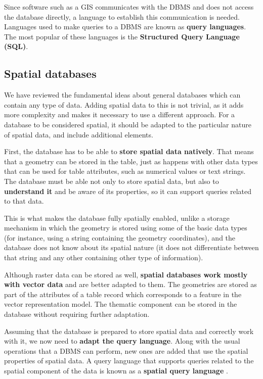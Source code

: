 Since software such as a GIS communicates with the DBMS and does not access the database directly, a language to establish this communication is needed. Languages used to make queries to a DBMS are known as \textbf{query languages}. The most popular of these languages is the \textbf{Structured Query Language (SQL)}.

\subsection{Spatial databases}

We have reviewed the fundamental ideas about general databases which can contain any type of data. Adding spatial data to this is not trivial, as it adds more complexity and makes it necessary to use a different approach. For a database to be considered spatial, it should be adapted to the particular nature of spatial data, and include additional elements.

First, the database has to be able to \textbf{store spatial data natively}. That means that a geometry can be stored in the table, just as happens with other data types that can be used for table attributes, such as numerical values or text strings. The database must be able not only to store spatial data, but also to \textbf{understand it} and be aware of its properties, so it can support queries related to that data. 

This is what makes the database fully spatially enabled, unlike a storage mechanism in which the geometry is stored using some of the basic data types (for instance, using a string containing the geometry coordinates), and the database does not know about its spatial nature (it does not differentiate between that string and any other containing other type of information).

Although raster data can be stored as well, \textbf{spatial databases work mostly with vector data} and are better adapted to them. The geometries are stored as part of the attributes of a table record which corresponds to a feature in the vector representation model. The thematic component can be stored in the database without requiring further adaptation.

Assuming that the database is prepared to store spatial data and correctly work with it, we now need to \textbf{adapt the query language}. Along with the usual operations that a DBMS can perform, new ones are added that use the spatial properties of spatial data. A query language that supports queries related to the spatial component of the data is known as a \textbf{spatial query language} .


